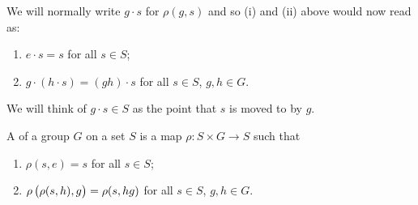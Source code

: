 \begin{notation}
We will normally write $g\cdot s$ for $\rho(g,s)$ and so (i) and (ii) above would now read as:
\begin{enumerate}[label=(\roman*)]
\item $e\cdot s=s$ for all $s\in S$;
\item $g\cdot(h\cdot s)=(gh)\cdot s$ for all $s\in S$, $g,h\in G$.
\end{enumerate}
\end{notation}

\begin{remark}
We will think of $g\cdot s\in S$ as the point that $s$ is moved to by $g$.
\end{remark}

\begin{definition}
A  of a group $G$ on a set $S$ is a map $\rho:S\times G\to S$ such that
\begin{enumerate}[label=(\roman*)]
\item $\rho(s,e)=s$ for all $s\in S$;
\item $\rho\left(\rho(s,h), g\right)=\rho(s,hg)$ for all $s\in S$, $g,h\in G$.
\end{enumerate}
\end{definition}